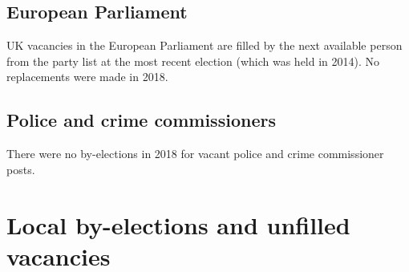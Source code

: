 \documentclass[a4paper,openany]{book}
\begin{document}
\section{European Parliament}

UK vacancies in the European Parliament are filled by the next available person from the party list at the most recent election (which was held in 2014). 
No replacements were made in 2018.

\section{Police and crime commissioners}

There were no by-elections in 2018 for vacant police and crime commissioner posts.

\chapter{Local by-elections and unfilled vacancies}
\end{document}
